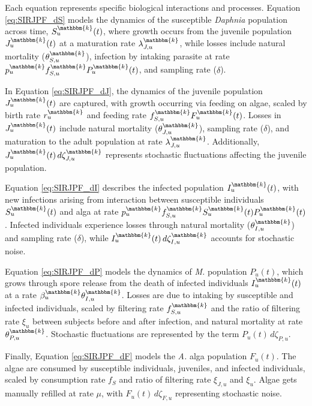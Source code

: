\documentclass[aoas,preprint]{imsart}\usepackage[]{graphicx}\usepackage[]{xcolor}
\newcommand\unit{u}
\newcommand\species{\mathbbm{k}}
\begin{document}
Each equation represents specific biological interactions and processes.
Equation \eqref{eq:SIRJPF_dS} models the dynamics of the susceptible \textit{Daphnia} population across time, $S^{\species}_{\unit}(t)$, where growth occurs from the juvenile population $J^{\species}_{\unit}(t)$ at a maturation rate $\lambda^{\species}_{J,\unit}$, while losses include natural mortality ($\theta^{\species}_{S,\unit}$), infection by intaking parasite at rate $p^{\species}_{\unit} f^{\species}_{S,\unit} P^{\species}_{\unit}(t)$, and sampling rate ($\delta$).
\parskip 3mm

In Equation \eqref{eq:SIRJPF_dJ}, the dynamics of the juvenile population $J^{\species}_{\unit}(t)$ are captured, with growth occurring via feeding on algae, scaled by birth rate $r^{\species}_{\unit}$ and feeding rate $f^{\species}_{S,\unit} F^{\species}_{\unit}(t)$.
Losses in $J^{\species}_{\unit}(t)$ include natural mortality ($\theta^{\species}_{J,\unit}$), sampling rate ($\delta$), and maturation to the adult population at rate $\lambda^{\species}_{J,\unit}$.
Additionally, $J^{\species}_{\unit}(t) \, d\zeta^{\species}_{J,\unit}$ represents stochastic fluctuations affecting the juvenile population.
\parskip 3mm

Equation \eqref{eq:SIRJPF_dI} describes the infected population $I^{\species}_{\unit}(t)$, with new infections arising from interaction between susceptible individuals $S^{\species}_{\unit}(t)$ and alga at rate $p^{\species}_{\unit} f^{\species}_{S,\unit} S^{\species}_{\unit}(t) P^{\species}_{\unit}(t)$.
Infected individuals experience losses through natural mortality ($\theta^{\species}_{I,\unit}$) and sampling rate ($\delta$), while $I^{\species}_{\unit}(t) \, d\zeta^{\species}_{I,\unit}$ accounts for stochastic noise.
\parskip 3mm

Equation \eqref{eq:SIRJPF_dP} models the dynamics of \textit{M.} population $P_{\unit}(t)$, which grows through spore release from the death of infected individuals $I^{\species}_{\unit}(t)$ at a rate $\beta^{\species}_{\unit} \theta^{\species}_{I,\unit}$.
Losses are due to intaking by susceptible and infected individuals, scaled by filtering rate $f^{\species}_{S,\unit}$ and the ratio of filtering rate $\xi_{\unit}$ between subjects before and after infection, and natural mortality at rate $\theta^{\species}_{P,\unit}$.
Stochastic fluctuations are represented by the term $P_{\unit}(t) \, d\zeta_{P,\unit}$.
\parskip 3mm

Finally, Equation \eqref{eq:SIRJPF_dF} models the \textit{A.} alga population $F_{\unit}(t)$. The algae are consumed by susceptible individuals, juveniles, and infected individuals, scaled by consumption rate $f_S$ and ratio of filtering rate $\xi_{J,\unit}$ and $\xi_{\unit}$. Algae gets manually refilled at rate $\mu$, with $F_{\unit}(t) \, d\zeta_{F,\unit}$ representing stochastic noise.
\parskip 3mm
\end{document}
